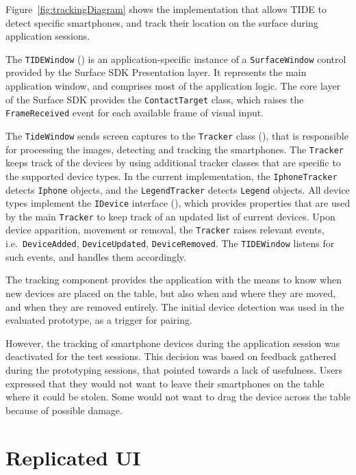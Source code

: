 Figure~\ref{fig:trackingDiagram} shows the implementation that allows TIDE to detect specific smartphones, and track their location on the surface during application sessions.

The \texttt{TIDEWindow} () is an application-specific instance of a \texttt{SurfaceWindow} control provided by the Surface SDK Presentation layer. 
It represents the main application window, and comprises most of the application logic.
The core layer of the Surface SDK provides the \texttt{ContactTarget} class, which raises the \texttt{FrameReceived} event for each available frame of visual input.

The \texttt{TideWindow} sends screen captures to the \texttt{Tracker} class (), that is responsible for processing the images, detecting and tracking the smartphones.
The \texttt{Tracker} keeps track of the devices by using additional tracker classes that are specific to the supported device types.
In the current implementation, the \texttt{IphoneTracker} detects \texttt{Iphone} objects, and the \texttt{LegendTracker} detects \texttt{Legend} objects.
All device types implement the \texttt{IDevice} interface (), which provides properties that are used by the main \texttt{Tracker} to keep track of an updated list of current devices.
Upon device apparition, movement or removal, the \texttt{Tracker} raises relevant events, i.e.\ \texttt{DeviceAdded}, \texttt{DeviceUpdated}, \texttt{DeviceRemoved}.
The \texttt{TIDEWindow} listens for such events, and handles them accordingly.

The tracking component provides the application with the means to know when new devices are placed on the table, but also when and where they are moved, and when they are removed entirely.
The initial device detection was used in the evaluated prototype, as a trigger for pairing.

However, the tracking of smartphone devices during the application session was deactivated for the test sessions.
This decision was based on feedback gathered during the prototyping sessions, that pointed towards a lack of usefulness.
Users expressed that they would not want to leave their smartphones on the table where it could be stolen.
Some would not want to drag the device across the table because of possible damage.

\section{Replicated UI}
\label{sec:replicatedui}

